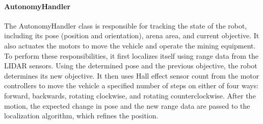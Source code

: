 \paragraph{AutonomyHandler}
The AutonomyHandler class is responsible for tracking the state of the robot, including its pose (position and orientation), arena area, and current objective.  It also actuates the motors to move the vehicle and operate the mining equipment.  To perform these responsibilities, it first localizes itself using range data from the LIDAR sensors.  Using the determined pose and the previous objective, the robot determines its new objective.  It then uses Hall effect sensor count from the motor controllers to move the vehicle a specified number of steps on either of four ways: forward, backwards, rotating clockwise, and rotating counterclockwise.  After the motion, the expected change in pose and the new range data are passed to the localization algorithm, which refines the position.
